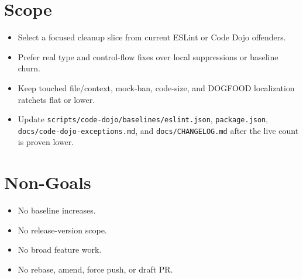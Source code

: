 \section{Scope}\label{record-229-scope}

\begin{itemize}
\tightlist
\item
  Select a focused cleanup slice from current ESLint or Code Dojo offenders.
\item
  Prefer real type and control-flow fixes over local suppressions or baseline churn.
\item
  Keep touched file/context, mock-ban, code-size, and DOGFOOD localization ratchets flat or lower.
\item
  Update \texttt{s\allowbreak{}c\allowbreak{}r\allowbreak{}i\allowbreak{}p\allowbreak{}t\allowbreak{}s\allowbreak{}/\allowbreak{}c\allowbreak{}o\allowbreak{}d\allowbreak{}e\allowbreak{}-\allowbreak{}d\allowbreak{}o\allowbreak{}j\allowbreak{}o\allowbreak{}/\allowbreak{}b\allowbreak{}a\allowbreak{}s\allowbreak{}e\allowbreak{}l\allowbreak{}i\allowbreak{}n\allowbreak{}e\allowbreak{}s\allowbreak{}/\allowbreak{}e\allowbreak{}s\allowbreak{}l\allowbreak{}i\allowbreak{}n\allowbreak{}t\allowbreak{}.\allowbreak{}j\allowbreak{}s\allowbreak{}o\allowbreak{}n}, \texttt{p\allowbreak{}a\allowbreak{}c\allowbreak{}k\allowbreak{}a\allowbreak{}g\allowbreak{}e\allowbreak{}.\allowbreak{}j\allowbreak{}s\allowbreak{}o\allowbreak{}n}, \texttt{d\allowbreak{}o\allowbreak{}c\allowbreak{}s\allowbreak{}/\allowbreak{}c\allowbreak{}o\allowbreak{}d\allowbreak{}e\allowbreak{}-\allowbreak{}d\allowbreak{}o\allowbreak{}j\allowbreak{}o\allowbreak{}-\allowbreak{}e\allowbreak{}x\allowbreak{}c\allowbreak{}e\allowbreak{}p\allowbreak{}t\allowbreak{}i\allowbreak{}o\allowbreak{}n\allowbreak{}s\allowbreak{}.\allowbreak{}m\allowbreak{}d}, and \texttt{d\allowbreak{}o\allowbreak{}c\allowbreak{}s\allowbreak{}/\allowbreak{}C\allowbreak{}H\allowbreak{}A\allowbreak{}N\allowbreak{}G\allowbreak{}E\allowbreak{}L\allowbreak{}O\allowbreak{}G\allowbreak{}.\allowbreak{}m\allowbreak{}d} after the live count is proven lower.
\end{itemize}

\section{Non-Goals}\label{record-229-non-goals}

\begin{itemize}
\tightlist
\item
  No baseline increases.
\item
  No release-version scope.
\item
  No broad feature work.
\item
  No rebase, amend, force push, or draft PR.
\end{itemize}

